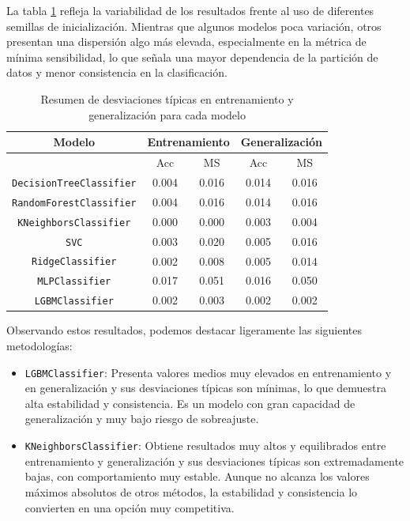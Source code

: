 La tabla \ref{tabla:resumen_std} refleja la variabilidad de los resultados frente al uso de diferentes semillas de inicialización. Mientras que algunos modelos poca variación, otros presentan una dispersión algo más elevada, especialmente en la métrica de mínima sensibilidad, lo que señala una mayor dependencia de la partición de datos y menor consistencia en la clasificación.

\begin{table}[H]
	\centering
	\begin{tabular}{|c|c|c|c|c|}
		\hline
		\rowcolor{LightCyan}
		Modelo & \multicolumn{2}{c|}{Entrenamiento} & \multicolumn{2}{c|}{Generalización} \\
		\hline
		\rowcolor{LightCyan}
		& Acc & MS & Acc & MS \\
		\hline
		\texttt{DecisionTreeClassifier} & 0.004 & 0.016 & 0.014 & 0.016 \\
		\texttt{RandomForestClassifier} & 0.004 & 0.016 & 0.014 & 0.016 \\
		\texttt{KNeighborsClassifier}   & 0.000 & 0.000 & 0.003 & 0.004 \\
		\texttt{SVC}                    & 0.003 & 0.020 & 0.005 & 0.016 \\
		\texttt{RidgeClassifier}        & 0.002 & 0.008 & 0.005 & 0.014 \\
		\texttt{MLPClassifier}          & 0.017 & 0.051 & 0.016 & 0.050 \\
		\texttt{LGBMClassifier}         & 0.002 & 0.003 & 0.002 & 0.002 \\
		\hline
	\end{tabular}
	\caption{Resumen de desviaciones típicas en entrenamiento y generalización para cada modelo}
	\label{tabla:resumen_std}
\end{table}

Observando estos resultados, podemos destacar ligeramente las siguientes metodologías:

\begin{itemize}
	\item \texttt{LGBMClassifier}: Presenta valores medios muy elevados en entrenamiento y en generalización y sus desviaciones típicas son mínimas, lo que demuestra alta estabilidad y consistencia. Es un modelo con gran capacidad de generalización y muy bajo riesgo de sobreajuste.
	\item \texttt{KNeighborsClassifier}: Obtiene resultados muy altos y equilibrados entre entrenamiento y generalización y sus desviaciones típicas son extremadamente bajas, con comportamiento muy estable. Aunque no alcanza los valores máximos absolutos de otros métodos, la estabilidad y consistencia lo convierten en una opción muy competitiva.
\end{itemize}

